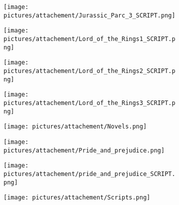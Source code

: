 \begin{figure} \ContinuedFloat
        \centering
        \begin{subfigure}{.49\textwidth}
                \centering
                \texttt{[image: pictures/attachement/Jurassic\_Parc\_3\_SCRIPT.png]}
        \end{subfigure}
        \begin{subfigure}{.49\textwidth}
                \centering
                \texttt{[image: pictures/attachement/Lord\_of\_the\_Rings1\_SCRIPT.png]}
        \end{subfigure}
\end{figure}
\begin{figure} \ContinuedFloat
        \centering
        \begin{subfigure}{.49\textwidth}
                \centering
                \texttt{[image: pictures/attachement/Lord\_of\_the\_Rings2\_SCRIPT.png]}
        \end{subfigure}
        \begin{subfigure}{.49\textwidth}
                \centering
                \texttt{[image: pictures/attachement/Lord\_of\_the\_Rings3\_SCRIPT.png]}
        \end{subfigure}
\end{figure}
\begin{figure} \ContinuedFloat
        \centering
        \begin{subfigure}{.49\textwidth}
                \centering
                \texttt{[image: pictures/attachement/Novels.png]}
        \end{subfigure}
        \begin{subfigure}{.49\textwidth}
                \centering
                \texttt{[image: pictures/attachement/Pride\_and\_prejudice.png]}
        \end{subfigure}
\end{figure}
\begin{figure} \ContinuedFloat
        \centering
        \begin{subfigure}{.49\textwidth}
                \centering
                \texttt{[image: pictures/attachement/pride\_and\_prejudice\_SCRIPT.png]}
        \end{subfigure}
        \begin{subfigure}{.49\textwidth}
                \centering
                \texttt{[image: pictures/attachement/Scripts.png]}
        \end{subfigure}
\end{figure}
